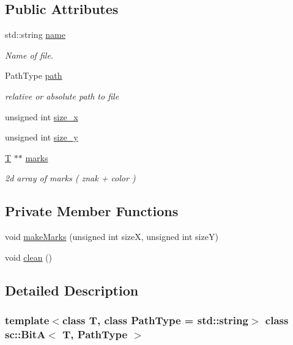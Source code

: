 \subsection*{Public Attributes}
\begin{DoxyCompactItemize}
\item 
std\+::string \mbox{\hyperlink{classsc_1_1_bit_a_aa384124759ff1305861c8db25217956c}{name}}
\begin{DoxyCompactList}\small\item\em Name of file. \end{DoxyCompactList}\item 
Path\+Type \mbox{\hyperlink{classsc_1_1_bit_a_a64708706afe986a022ec7eee4a75aca5}{path}}
\begin{DoxyCompactList}\small\item\em relative or absolute path to file \end{DoxyCompactList}\item 
unsigned int \mbox{\hyperlink{classsc_1_1_bit_a_ae9ada64952c1dd3df063eb63e79651a1}{size\+\_\+x}}
\item 
unsigned int \mbox{\hyperlink{classsc_1_1_bit_a_a9309d66c6d75ae9dfda2be5dbfcd4b05}{size\+\_\+y}}
\item 
\mbox{\hyperlink{_keyboard_event_8h_adf1f3edb9115acb0a1e04209b7a9937b}{T}} $\ast$$\ast$ \mbox{\hyperlink{classsc_1_1_bit_a_abf6254d67d78b69385eb9979bff258af}{marks}}
\begin{DoxyCompactList}\small\item\em 2d array of marks ( znak + color ) \end{DoxyCompactList}\end{DoxyCompactItemize}
\subsection*{Private Member Functions}
\begin{DoxyCompactItemize}
\item 
void \mbox{\hyperlink{classsc_1_1_bit_a_a260a201ed0001e31536b483c06ec05e6}{make\+Marks}} (unsigned int sizeX, unsigned int sizeY)
\item 
void \mbox{\hyperlink{classsc_1_1_bit_a_aba89b38422bfd070976920c78152a8e6}{clean}} ()
\end{DoxyCompactItemize}


\subsection{Detailed Description}
\subsubsection*{template$<$class T, class Path\+Type = std\+::string$>$\newline
class sc\+::\+Bit\+A$<$ T, Path\+Type $>$}

